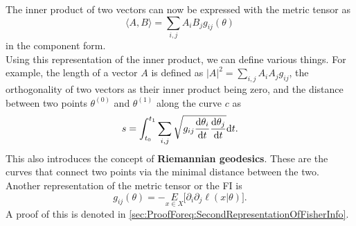 The inner product of two vectors can now be expressed with the metric tensor as \cite{AmarisLectureNotes}
\begin{equation}
	\langle A,B \rangle = \sum_{i,j} A_iB_jg_{ij}(\theta)
\end{equation}
in the component form.\\
Using this representation of the inner product, we can define various things. For example, the length of a vector $A$ is defined as $|A|^2 = \sum_{i,j} A_iA_j g_{ij}$, the orthogonality of two vectors as their inner product being zero, and the distance between two points $\theta^{(0)}$ and $\theta^{(1)}$ along the curve $c$ as \cite{AmarisLectureNotes}
\begin{equation}
	s = \int_{t_0}^{t_1} \sum_{i,j} \sqrt{g_{ij}\frac{\mathrm{d}\theta_i}{\mathrm{d}t}\frac{\mathrm{d}\theta_j}{\mathrm{d}t}} \mathrm{d}t. 
\end{equation}
This also introduces the concept of \textbf{Riemannian geodesics}. These are the curves that connect two points via the minimal distance between the two.\\
Another representation of the metric tensor or the FI is \cite{AmarisLectureNotes} 
\begin{equation}\label{eq:SecondRepresentationOfFisherInfo}
	g_{ij}(\theta) = - \underset{x\in X}{E} \Big[ \partial_i \partial_j \ell(x|\theta) \Big].
\end{equation}
A proof of this is denoted in \cref{sec:ProofForeq:SecondRepresentationOfFisherInfo}.

